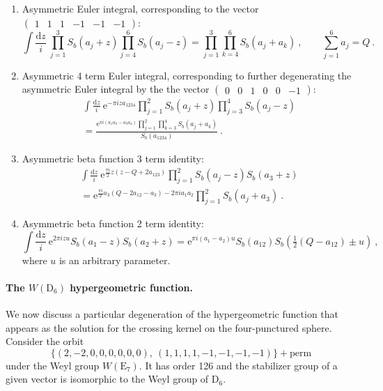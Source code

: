 \documentclass[12pt,a4paper]{article}
\newcommand{\be}{\begin{equation}}
\newcommand{\ee}{\end{equation}}
\begin{document}
\begin{enumerate}
\begin{align}
    \end{align}
    \item Asymmetric Euler integral, corresponding to the vector $\begin{pmatrix}
        1 & 1 & 1 & -1 & -1 & -1
    \end{pmatrix}$:
        \be 
            \int \frac{\mathrm{d}z}{i}\ \prod_{j=1}^3 S_b(a_j+z) \prod_{j=4}^6 S_b(a_j-z)=\prod_{j=1}^3 \prod_{k=4}^6 S_b(a_j+a_k)\ , \qquad \sum_{j=1}^6 a_j=Q\ . \label{eq:S_b beta integral identity asymmetric}
        \ee
    \item Asymmetric 4 term Euler integral, corresponding to further degenerating the asymmetric Euler integral by the the vector $\begin{pmatrix}
        0 & 0 & 1 & 0 & 0 & -1
    \end{pmatrix}$:
    \begin{multline} 
         \int \frac{\mathrm{d}z}{i}\  \mathrm{e}^{-\pi i za_{1234}}\prod_{j=1}^2 S_b(a_j+z) \prod_{j=3}^4 S_b(a_j-z) \\
         =\frac{\mathrm{e}^{\pi i(a_1a_2-a_3a_4)} \prod_{j=1}^2 \prod_{k=3}^4 S_b(a_j+a_k)}{S_b(a_{1234})}\ . \label{eq:S_b beta integral identity asymmetric 4 terms}
    \end{multline}
    \item Asymmetric beta function 3 term identity:
    \begin{multline} 
         \int \frac{\mathrm{d}z}{i}\  \mathrm{e}^{\frac{\pi i}{2}z(z-Q+2a_{123})}  \prod_{j=1}^2 S_b(a_j-z)S_b(a_3+z)\\ 
         =\mathrm{e}^{\frac{\pi i}{2}a_3(Q-2a_{12}-a_3)-2\pi i a_1a_2} \prod_{j=1}^2 S_b(a_j+a_3)\ . \label{eq:S_b beta integral identity asymmetric 3 terms}
    \end{multline}
    \item Asymmetric beta function 2 term identity:
    \be 
        \int \frac{\mathrm{d}z}{i}\  \mathrm{e}^{2\pi i z u} S_b(a_1-z)S_b(a_2+z) =\mathrm{e}^{\pi i (a_1-a_2)u} S_b(a_{12}) S_b(\tfrac{1}{2}(Q-a_{12}) \pm u)\ , \label{eq:S_b beta integral identity asymmetric 2 terms}
    \ee
    where $u$ is an arbitrary parameter.
\end{enumerate}
\paragraph{The $W(\mathrm{D}_6)$ hypergeometric function.} We now discuss a particular degeneration of the hypergeometric function that appears as the solution for the crossing kernel on the four-punctured sphere. Consider the orbit
\be 
\{(2,-2,0,0,0,0,0,0),\ (1,1,1,1,-1,-1,-1,-1)\}+\text{perm} \label{eq:D6 orbit}
\ee
under the Weyl group $W(\mathrm{E}_7)$. It has order \num{126} and the stabilizer group of a given vector is isomorphic to the Weyl group of $\mathrm{D}_6$.
\end{document}
